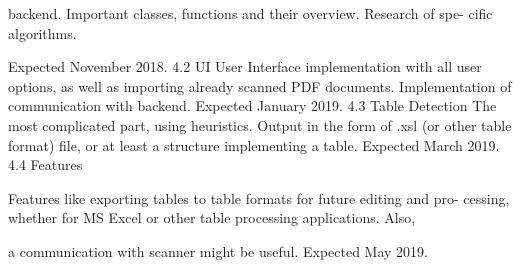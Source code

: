 backend. Important classes, functions and their overview. Research of spe-
cific algorithms.

Expected November 2018.
4.2 UI
User Interface implementation with all user options, as well as importing
already scanned PDF documents. Implementation of communication with
backend.
Expected January 2019.
4.3 Table Detection
The most complicated part, using heuristics. Output in the form of .xsl (or
other table format) file, or at least a structure implementing a table.
Expected March 2019.
4.4 Features

Features like exporting tables to table formats for future editing and pro-
cessing, whether for MS Excel or other table processing applications. Also,

a communication with scanner might be useful.
Expected May 2019.